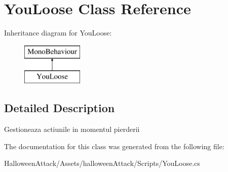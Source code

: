 \hypertarget{class_you_loose}{}\section{You\+Loose Class Reference}
\label{class_you_loose}
Inheritance diagram for You\+Loose\+:\begin{figure}[H]
\begin{center}
\leavevmode
\includegraphics[height=2.000000cm]{class_you_loose}
\end{center}
\end{figure}


\subsection{Detailed Description}
Gestioneaza actiunile in momentul pierderii 

The documentation for this class was generated from the following file\+:\begin{DoxyCompactItemize}
\item 
Halloween\+Attack/\+Assets/halloween\+Attack/\+Scripts/You\+Loose.\+cs\end{DoxyCompactItemize}
